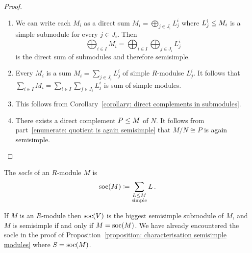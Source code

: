 \begin{proof}
  \leavevmode
  \begin{enumerate}
    \item
      We can write each $M_i$ as a direct sum $M_i = \bigoplus_{j \in J_i} L^i_j$ where $L^i_j \leq M_i$ is a simple submodule for every $j \in J_i$.
      Then
      \[
          \bigoplus_{i \in I} M_i
        = \bigoplus_{i \in I} \bigoplus_{j \in J_i} L^i_j
      \]
      is the direct sum of submodules and therefore semisimple.
    \item
      Every $M_i$ is a sum $M_i = \sum_{j \in J_i} L^i_j$ of simple $R$-modulse $L^i_j$.
      It follows that $\sum_{i \in I} M_i = \sum_{i \in I} \sum_{j \in J_i} L^i_j$ is sum of simple modules.
    \item
      This follows from Corollary~\ref{corollary: direct complements in submodules}.
    \item
      There exists a direct complement $P \leq M$ of $N$.
      It follows from part~\ref*{enumerate: quotient is again semisimple} that $M/N \cong P$ is again semisimple.
    \qedhere
  \end{enumerate}
\end{proof}


\begin{definition}
  The \emph{socle} of an $R$-module $M$ is
  \[
              \operatorname{soc}(M)
    \coloneqq  \sum_{\substack{L \leq M \\ \text{simple}}} L \,.
  \]
\end{definition}


\begin{remark}
  If $M$ is an $R$-module then $\operatorname{soc}(V)$ is the biggest semisimple submodule of $M$, and $M$ is semisimple if and only if $M = \operatorname{soc}(M)$.
  We have already encountered the socle in the proof of Proposition~\ref{proposition: characterisation semisimple modules} where $S = \operatorname{soc}(M)$.
\end{remark}


